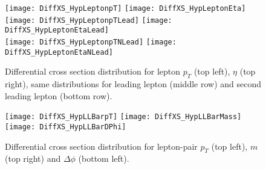 


\begin{figure}
  \texttt{[image: DiffXS\_HypLeptonpT]}
  \texttt{[image: DiffXS\_HypLeptonEta]}\\
  \texttt{[image: DiffXS\_HypLeptonpTLead]}
  \texttt{[image: DiffXS\_HypLeptonEtaLead]}\\
  \texttt{[image: DiffXS\_HypLeptonpTNLead]}
  \texttt{[image: DiffXS\_HypLeptonEtaNLead]}\\
\caption{Differential cross section distribution for lepton $p_T$ (top left), $\eta$ (top right), same distributions for leading lepton (middle row) and second leading lepton (bottom row).}
\end{figure}

\clearpage
\newpage



\begin{figure}
  \texttt{[image: DiffXS\_HypLLBarpT]}
  \texttt{[image: DiffXS\_HypLLBarMass]}\\
  \texttt{[image: DiffXS\_HypLLBarDPhi]}
\caption{Differential cross section distribution for lepton-pair $p_T$ (top left), $m$ (top right) and $\Delta\phi$ (bottom left).}
\end{figure}



